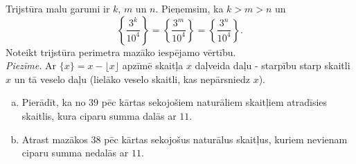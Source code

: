 \documentclass[11pt]{article}
\begin{document}
\begin{problem}
Trijstūra malu garumi ir $k$, $m$ un $n$. Pieņemsim, ka $k > m > n$ un 
$$\left\{ \frac{3^k}{10^4} \right\} = \left\{ \frac{3^m}{10^4} \right\} = \left\{ \frac{3^n}{10^4} \right\}.$$
Noteikt trijstūra perimetra mazāko iespējamo vērtību.\\ 
{\em Piezīme.} Ar $\{ x \} = x - \lfloor x \rfloor$ apzīmē skaitļa $x$ daļveida daļu - 
starpību starp skaitli $x$ un tā veselo daļu (lielāko veselo 
skaitli, kas nepārsniedz $x$).
\end{problem}

\begin{problem}
\begin{enumerate}[(a)]
\item Pierādīt, ka no $39$ pēc kārtas sekojošiem naturāliem skaitļiem atradīsies skaitlis, 
kura ciparu summa dalās ar $11$.
\item Atrast mazākos $38$ pēc kārtas sekojošus naturālus skaitļus, kuriem nevienam 
ciparu summa nedalās ar $11$.
\end{enumerate}
\end{problem}
\end{document}
